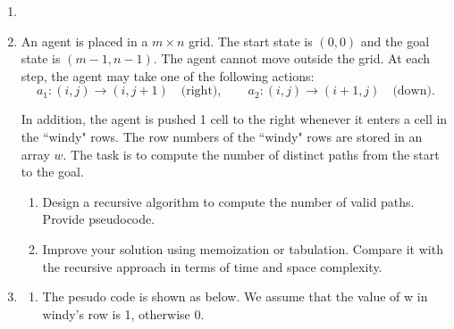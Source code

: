 \documentclass[12pt,a4paper]{article}
\makeatletter
\newtheorem*{solution}{Solution}
\theoremstyle{definition}
\renewenvironment{solution}[1][Solution] {\par\pushQED{\qed}\normalfont\topsep6\p@\@plus6\p@\relax\trivlist\item[\hskip\labelsep\bfseries#1\@addpunct{.}]\ignorespaces}{\popQED\endtrivlist\@endpefalse} \makeatother
\makeatother
\begin{document}
\begin{enumerate}
\begin{solution}
\begin{enumerate}
    \end{enumerate}
\end{solution}

    \item {\color{purple}{(Windy World DP)}}
    
    An agent is placed in a $m \times n$ grid. The start state is $(0,0)$ and the goal state is $(m-1, n-1)$. The agent cannot move outside the grid. At each step, the agent may take one of the following actions:
    \[
    a_1: (i,j)\rightarrow(i,j+1) \quad \text{(right)}, \qquad
    a_2: (i,j)\rightarrow(i+1,j) \quad \text{(down)}.
    \]
    
    In addition, the agent is pushed 1 cell to the right whenever it enters a cell in the ``windy" rows. The row numbers of the ``windy" rows are stored in an array $w$.  The task is to compute the number of distinct paths from the start to the goal.

    \begin{enumerate}
        \item Design a recursive algorithm to compute the number of valid paths. Provide pseudocode.
    
        \item Improve your solution using memoization or tabulation. Compare it with the recursive approach in terms of time and space complexity.
    \end{enumerate}

    \begin{solution}
        \begin{enumerate}
            \item The pesudo code is shown as below. We assume that the value of w in windy's row is 1, otherwise 0. 

        \begin{minipage}{\linewidth}
        \begin{algorithm}[H]
        \caption{Windy World Valid Paths (Recursive)}
        \label{alg:WW_Recursive}
        \end{algorithm}
        \end{minipage}


\end{enumerate}
\end{solution}
\end{enumerate}
\end{document}
